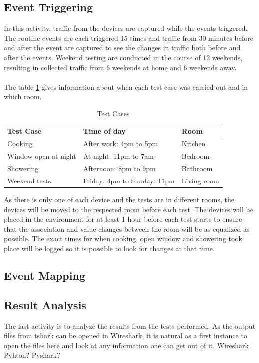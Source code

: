 \subsection{Event Triggering}
In this activity, traffic from the devices are captured while the events triggered. The routine events are each triggered 15 times and traffic from 30 minutes before and after the event are captured to see the changes in traffic both before and after the events. Weekend testing are conducted in the course of 12 weekends, resulting in collected traffic from 6 weekends at home and 6 weekends away. 
\\\\
The table \ref{tab:TestCases} gives information about when each test case was carried out and in which room. 
\begin{table}[!hbtp]
    \centering
    \caption{Test Cases}
    \begin{adjustbox}{width=1\textwidth}
    \begin{tabular}{| p{5cm} | p{5cm} | p{3cm} |} 
        \hline
        \textbf{Test Case} & \textbf{Time of day} & \textbf{Room} \\
        \hline
        Cooking & After work: 4pm to 5pm & Kitchen \\
        \hline
        Window open at night & At night: 11pm to 7am & Bedroom\\
        \hline
        Showering & Afternoon: 8pm to 9pm & Bathroom \\
        \hline
        Weekend tests & Friday: 4pm to Sunday: 11pm & Living room \\
        \hline
    \end{tabular}
    \end{adjustbox}
    \label{tab:TestCases}
\end{table}

As there is only one of each device and the tests are in different rooms, the devices will be moved to the respected room before each test. The devices will be placed in the environment for at least 1 hour before each test starts to ensure that the association and value changes between the room will be as equalized as possible. The exact times for when cooking, open window and showering took place will be logged so it is possible to look for changes at that time. 

\subsection{Event Mapping}

\subsection{Result Analysis}
The last activity is to analyze the results from the tests performed. As the output files from tshark can be opened in Wireshark, it is natural as a first instance to open the files here and look at any information one can get out of it. 
Wireshark
Pyhton? Pyshark?